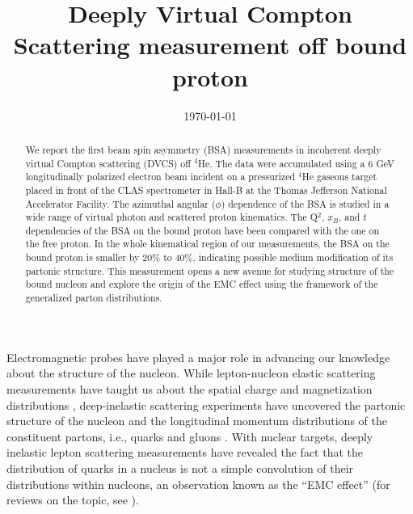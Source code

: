 \documentclass[twocolumn,nofootinbib,showpacs,prl,superscriptaddress,secnumarabic,amssymb,nobibnotes,aps,floatfix]{revtex4}
\begin{document}
\linenumbers

\title{Deeply Virtual Compton Scattering measurement off bound proton}



\date{\today}
\begin{abstract}
 We report the first beam spin asymmetry (BSA) measurements in incoherent 
   deeply virtual Compton scattering (DVCS) off $^4$He. The data were 
   accumulated using a 6 GeV longitudinally 
   polarized electron beam incident on a pressurized $^4$He gaseous target 
   placed in front of the CLAS spectrometer in Hall-B at the Thomas Jefferson 
   National Accelerator Facility. The azimuthal angular ($\phi$) dependence of 
   the BSA is studied in a wide range of virtual photon and scattered proton 
   kinematics. The Q$^2$, $x_B$, and $t$ dependencies of the BSA on the bound 
   proton have been compared with the one on the free proton. In the whole 
   kinematical region of our measurements, the BSA on the bound proton is 
   smaller by $20\%$ to $40\%$, indicating possible medium modification 
   of its partonic structure. This measurement opens a new avenue for 
   studying structure of the bound nucleon and explore the origin of the EMC 
   effect using the framework of the generalized parton distributions.

\end{abstract}

\maketitle 

Electromagnetic probes have played a major role in advancing our knowledge 
about the structure of the nucleon. While lepton-nucleon elastic scattering 
measurements have 
taught us about the spatial charge and magnetization distributions 
\cite{Hofstadter:1955ae,Perdrisat:2006hj}, deep-inelastic scattering 
experiments have uncovered the partonic structure of the nucleon and 
the longitudinal momentum distributions of the constituent partons, i.e., 
quarks and gluons \cite{pdg}.  With nuclear targets, deeply inelastic lepton 
scattering measurements have revealed the fact that the distribution of quarks 
in a nucleus is not a simple convolution of their distributions within 
nucleons, an observation known as the ``EMC effect''\cite{EMC_first} (for 
reviews on the topic, see  
\cite{Arneodo:1992wf,Geesaman:1995yd,Norton:2003cb,Hen:2016kwk}).
\end{document}

